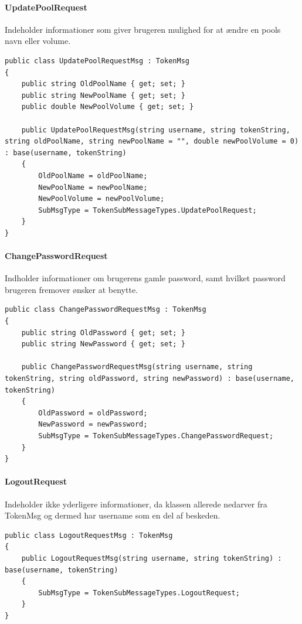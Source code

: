 \paragraph{UpdatePoolRequest}
Indeholder informationer som giver brugeren mulighed for at ændre en pools navn eller volume.
\begin{lstlisting}[caption=UpdatePoolRequest, label=code:UpdatePoolRequest]
public class UpdatePoolRequestMsg : TokenMsg
{
	public string OldPoolName { get; set; }
	public string NewPoolName { get; set; }
	public double NewPoolVolume { get; set; }
	
	public UpdatePoolRequestMsg(string username, string tokenString, string oldPoolName, string newPoolName = "", double newPoolVolume = 0) : base(username, tokenString)
	{
		OldPoolName = oldPoolName;
		NewPoolName = newPoolName;
		NewPoolVolume = newPoolVolume;
		SubMsgType = TokenSubMessageTypes.UpdatePoolRequest;
	}
}
\end{lstlisting}

\paragraph{ChangePasswordRequest}
Indholder informationer om brugerens gamle password, samt hvilket password brugeren fremover ønsker at benytte.
\begin{lstlisting}[caption=ChangePasswordRequest, label=code:ChangePasswordRequest]
public class ChangePasswordRequestMsg : TokenMsg
{
	public string OldPassword { get; set; }
	public string NewPassword { get; set; }
	
	public ChangePasswordRequestMsg(string username, string tokenString, string oldPassword, string newPassword) : base(username, tokenString)
	{
		OldPassword = oldPassword;
		NewPassword = newPassword;
		SubMsgType = TokenSubMessageTypes.ChangePasswordRequest;
	}
}
\end{lstlisting}

\paragraph{LogoutRequest}
Indeholder ikke yderligere informationer, da klassen allerede nedarver fra TokenMsg og dermed har username som en del af beskeden.
\begin{lstlisting}[caption=LogoutRequest, label=code:LogoutRequest]
public class LogoutRequestMsg : TokenMsg
{
	public LogoutRequestMsg(string username, string tokenString) : base(username, tokenString)
	{
		SubMsgType = TokenSubMessageTypes.LogoutRequest;
	}
}
\end{lstlisting}


